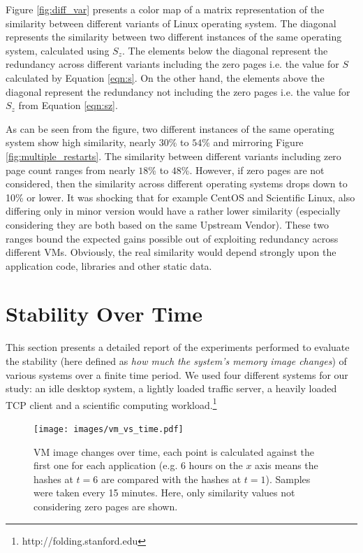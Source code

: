 \documentclass{acm_proc_article-sp}
\begin{document}
Figure \ref{fig:diff_var} presents a color map of a matrix representation of the similarity between different variants of Linux operating system. The diagonal represents the similarity between two different instances of the same operating system, calculated using $S_z$. The elements below the diagonal represent the redundancy across different variants including the zero pages i.e. the value for $S$ calculated by Equation \ref{eqn:s}. On the other hand, the elements above the diagonal represent the redundancy not including the zero pages i.e. the value for $S_z$ from Equation \ref{eqn:sz}.

As can be seen from the figure, two different instances of the same operating system show high similarity, nearly $30$\% to $54$\% and mirroring Figure \ref{fig:multiple_restarts}. The similarity between different variants including zero page count ranges from nearly $18$\% to $48$\%. However, if zero pages are not considered, then the similarity across different operating systems drops down to 10\% or lower.  It was shocking that for example CentOS and Scientific Linux, also differing only in minor version would have a rather lower similarity (especially considering they are both based on the same Upstream Vendor).  These two ranges bound the expected gains possible out of exploiting redundancy across different VMs.  Obviously, the real similarity would depend strongly upon the application code, libraries and other static data. 

\section{Stability Over Time}
This section presents a detailed report of the experiments performed to evaluate the stability (here defined as \textit{how much the system's memory image changes}) of various systems over a finite time period. We used four different systems for our study: an idle desktop system, a lightly loaded traffic server, a heavily loaded TCP client and a scientific computing workload.\footnote{http://folding.stanford.edu}


\begin{figure}
  \centering
  \texttt{[image: images/vm\_vs\_time.pdf]}
  \caption{VM image changes over time, each point is calculated against the first one for each application (e.g. 6 hours on the $x$ axis means the hashes at $t=6$ are compared with the hashes at $t=1$). Samples were taken every 15 minutes. Here, only similarity values not considering zero pages are shown.}\label{fig:vm_vs_time}
\end{figure}
\end{document}
